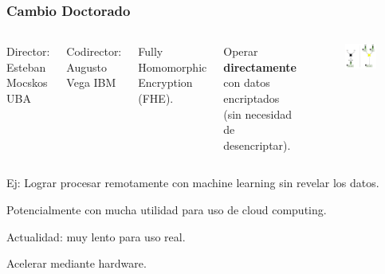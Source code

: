 \documentclass[10pt]{beamer}
\begin{document}
\begin{frame}
\frametitle{Cambio Doctorado}

\begin{columns}
        Director: Esteban Mocskos UBA
        \vspace{0.3cm}

        Codirector: Augusto Vega IBM

        \vspace{0.3cm}
        Fully Homomorphic Encryption (FHE).

        \vspace{0.3cm}
        Operar \textbf{directamente} con datos encriptados (sin necesidad de desencriptar).


\begin{figure}[h!]
    \centering
    \includegraphics[scale=0.19]{mult.jpg}
\end{figure}
\end{columns}


Ej: Lograr procesar remotamente con machine learning sin revelar los datos.

Potencialmente con mucha utilidad para uso de cloud computing.

Actualidad: muy lento para uso real.

\begin{mdframed}[backgroundcolor=frenchblue!20]\centering
  Acelerar mediante hardware.
\end{mdframed}

\end{frame}
\end{document}
